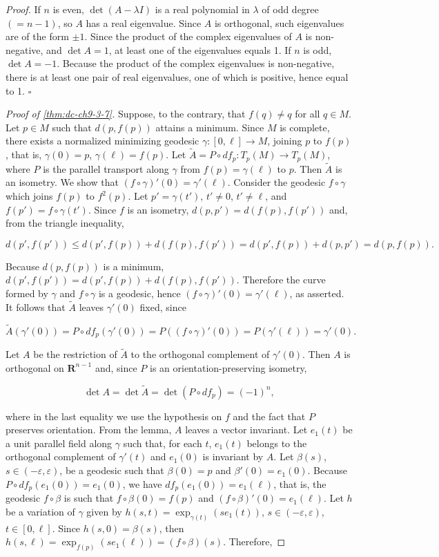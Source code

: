 \begin{proof}
  If $n$ is even, $\det(A-\lambda I)$ is a real polynomial in $\lambda$ of
  odd degree $(=n-1)$, so $A$ has a real eigenvalue. Since $A$ is orthogonal, such
  eigenvalues are of the form $\pm 1$. Since the product of the complex eigenvalues
  of $A$ is non-negative, and $\det A=1$, at least one of the eigenvalues equals 1.
  If $n$ is odd, $\det A=-1$. Because the product of the complex eigenvalues is
  non-negative, there is at least one pair of real eigenvalues, one of which is
  positive, hence equal to 1. $\square$
  
  \emph{Proof of \cref{thm:dc-ch9-3-7}.} Suppose, to the contrary, that $f(q)\ne q$ for all $q\in M$.
  Let $p\in M$ such that $d(p,f(p))$ attains a minimum. Since $M$ is complete, there
  exists a normalized minimizing geodesic $\gamma:[0,\ell]\to M$, joining $p$ to
  $f(p)$, that is, $\gamma(0)=p$, $\gamma(\ell)=f(p)$. Let
  $\tilde A=P\circ df_p:T_p(M)\to T_p(M)$, where $P$ is the parallel transport along
  $\gamma$ from $f(p)=\gamma(\ell)$ to $p$. Then $\tilde A$ is an isometry. We show
  that $(f\circ\gamma)'(0)=\gamma'(\ell)$. Consider the geodesic $f\circ\gamma$ which
  joins $f(p)$ to $f^2(p)$. Let $p'=\gamma(t')$, $t'\ne 0$, $t'\ne\ell$, and
  $f(p')=f\circ\gamma(t')$. Since $f$ is an isometry, $d(p,p')=d(f(p),f(p'))$ and,
  from the triangle inequality,
  
  $$
  d(p',f(p'))\le d(p',f(p))+d(f(p),f(p'))=d(p',f(p))+d(p,p')=d(p,f(p)).
  $$
  
  Because $d(p,f(p))$ is a minimum, $d(p',f(p'))=d(p',f(p))+d(f(p),f(p'))$. Therefore
  the curve formed by $\gamma$ and $f\circ\gamma$ is a geodesic, hence
  $(f\circ\gamma)'(0)=\gamma'(\ell)$, as asserted. It follows that $\tilde A$ leaves
  $\gamma'(0)$ fixed, since
  
  $$
  \tilde A(\gamma'(0))=P\circ df_p(\gamma'(0))=P((f\circ\gamma)'(0))=P(\gamma'(\ell))=\gamma'(0).
  $$
  
  Let $A$ be the restriction of $\tilde A$ to the orthogonal complement of
  $\gamma'(0)$. Then $A$ is orthogonal on $\mathbf{R}^{n-1}$ and, since $P$ is an
  orientation-preserving isometry,
  
  $$
  \det A=\det\tilde A=\det(P\circ df_p)=(-1)^n,
  $$
  
  where in the last equality we use the hypothesis on $f$ and the fact that $P$
  preserves orientation. From the lemma, $A$ leaves a vector invariant. Let $e_1(t)$
  be a unit parallel field along $\gamma$ such that, for each $t$, $e_1(t)$ belongs to
  the orthogonal complement of $\gamma'(t)$ and $e_1(0)$ is invariant by $A$. Let
  $\beta(s)$, $s\in(-\varepsilon,\varepsilon)$, be a geodesic such that $\beta(0)=p$ and
  $\beta'(0)=e_1(0)$. Because $P\circ df_p(e_1(0))=e_1(0)$, we have
  $df_p(e_1(0))=e_1(\ell)$, that is, the geodesic $f\circ\beta$ is such that
  $f\circ\beta(0)=f(p)$ and $(f\circ\beta)'(0)=e_1(\ell)$. Let $h$ be a variation of
  $\gamma$ given by $h(s,t)=\exp_{\gamma(t)}(se_1(t))$,
  $s\in(-\varepsilon,\varepsilon)$, $t\in[0,\ell]$. Since $h(s,0)=\beta(s)$, then
  $h(s,\ell)=\exp_{f(p)}(se_1(\ell))=(f\circ\beta)(s)$. Therefore,
  

\end{proof}

